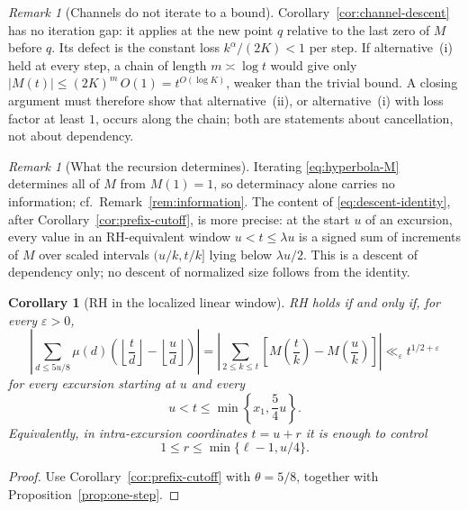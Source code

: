 \documentclass[11pt]{amsart}
\numberwithin{equation}{section}
\theoremstyle{plain}
\newtheorem{corollary}[theorem]{Corollary}
\theoremstyle{definition}
\theoremstyle{remark}
\newtheorem{remark}[theorem]{Remark}
\newcommand{\eps}{\varepsilon}
\begin{document}
\begin{remark}[Channels do not iterate to a bound]
\label{rem:channel-loss}
Corollary~\ref{cor:channel-descent} has no iteration gap: it applies at
the new point $q$ relative to the last zero of $M$ before $q$. Its defect
is the constant loss $k^\alpha/(2K)<1$ per step. If alternative~(i) held at
every step, a chain of length $m\asymp\log t$ would give only
$|M(t)|\le(2K)^m\,O(1)=t^{O(\log K)}$, weaker than the trivial bound.
A closing argument must therefore show that alternative~(ii), or
alternative~(i) with loss factor at least $1$, occurs along the chain; both
are statements about cancellation, not about dependency.
\end{remark}


\begin{remark}[What the recursion determines]
\label{rem:recursion-content}
Iterating \eqref{eq:hyperbola-M} determines all of $M$ from $M(1)=1$, so
determinacy alone carries no information; cf.\
Remark~\ref{rem:information}.  The content of
\eqref{eq:descent-identity}, after Corollary~\ref{cor:prefix-cutoff}, is
more precise: at the start $u$ of an excursion, every value in an
RH-equivalent window $u<t\le\lambda u$ is a signed sum of increments of
$M$ over scaled intervals $(u/k,t/k]$ lying below $\lambda u/2$.  This is a
descent of dependency only; no descent of normalized size follows from the
identity.
\end{remark}

\begin{corollary}[RH in the localized linear window]
\label{cor:linear-window-RH}
RH holds if and only if, for every $\eps>0$,
\[
\left|\sum_{d\le5u/8}\mu(d)\left(\left\lfloor\frac td\right\rfloor
-\left\lfloor\frac ud\right\rfloor\right)\right|
=\left|\sum_{2\le k\le t}\left[M\left(\frac tk\right)-M\left(\frac uk\right)\right]\right|
\ll_\eps t^{1/2+\eps}
\]
for every excursion starting at $u$ and every
\[
u<t\le\min\left\{x_1,\frac54u\right\}.
\]
Equivalently, in intra-excursion coordinates $t=u+r$ it is enough to
control
\[
1\le r\le\min\{\ell-1,u/4\}.
\]
\end{corollary}

\begin{proof}
Use Corollary~\ref{cor:prefix-cutoff} with $\theta=5/8$, together with
Proposition~\ref{prop:one-step}.
\end{proof}
\end{document}
